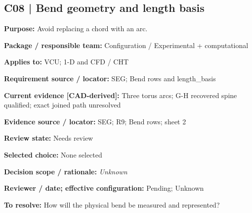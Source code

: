\documentclass[11pt]{article}
\begin{document}
\par\noindent\begin{minipage}{\textwidth}\small\setlength{\parskip}{2pt}
\subsection*{C08 | Bend geometry and length basis}
\textbf{Purpose:} Avoid replacing a chord with an arc.\par
\textbf{Package / responsible team:} Configuration / Experimental + computational\par
\textbf{Applies to:} VCU; 1-D and CFD / CHT\par
\textbf{Requirement source / locator:} SEG; Bend rows and length\_\allowbreak{}basis\par
\textbf{Current evidence [CAD-derived]:} Three torus arcs; G-H recovered spine qualified; exact joined path unresolved\par
\textbf{Evidence source / locator:} SEG; R9; Bend rows; sheet 2\par
\textbf{Review state:} Needs review\par
\textbf{Selected choice:} None selected\par
\textbf{Decision scope / rationale:} \textit{Unknown}\par
\textbf{Reviewer / date; effective configuration:} Pending; Unknown\par
\textbf{To resolve:} How will the physical bend be measured and represented?\par
\end{minipage}\par\vspace{5pt}
\end{document}
